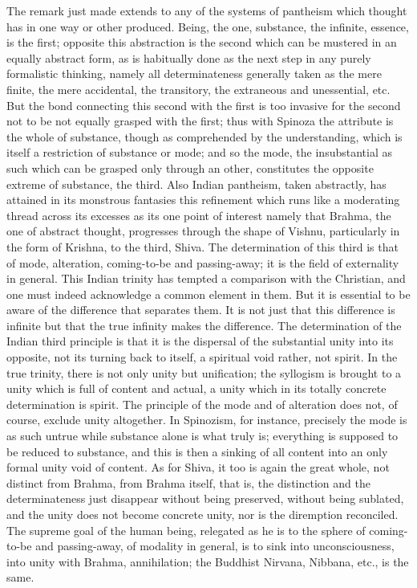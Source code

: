 The remark just made extends to any of the systems of pantheism
which thought has in one way or other produced.
Being, the one, substance, the infinite, essence, is the first;
opposite this abstraction is the second which
can be mustered in an equally abstract form,
as is habitually done as the next step in any purely formalistic thinking,
namely all determinateness generally taken as the mere finite,
the mere accidental, the transitory, the extraneous and unessential, etc.
But the bond connecting this second with the first is too invasive
for the second not to be not equally grasped with the first;
thus with Spinoza the attribute is the whole of substance,
though as comprehended by the understanding,
which is itself a restriction of substance or mode;
and so the mode, the insubstantial as such which can
be grasped only through an other,
constitutes the opposite extreme of substance, the third.
Also Indian pantheism, taken abstractly, has attained
in its monstrous fantasies this refinement
which runs like a moderating thread across its excesses
as its one point of interest namely
that Brahma, the one of abstract thought,
progresses through the shape of Vishnu,
particularly in the form of Krishna, to the third, Shiva.
The determination of this third is that of mode, alteration,
coming-to-be and passing-away;
it is the field of externality in general.
This Indian trinity has tempted a comparison with the Christian,
and one must indeed acknowledge a common element in them.
But it is essential to be aware of the difference that separates them.
It is not just that this difference is infinite
but that the true infinity makes the difference.
The determination of the Indian third principle is that
it is the dispersal of the substantial unity into its opposite,
not its turning back to itself,
a spiritual void rather, not spirit.
In the true trinity, there is not only unity but unification;
the syllogism is brought to a unity which is full of content and actual,
a unity which in its totally concrete determination is spirit.
The principle of the mode and of alteration
does not, of course, exclude unity altogether.
In Spinozism, for instance, precisely the mode is as such untrue
while substance alone is what truly is;
everything is supposed to be reduced to substance,
and this is then a sinking of all content into
an only formal unity void of content.
As for Shiva, it too is again the great whole,
not distinct from Brahma, from Brahma itself, that is,
the distinction and the determinateness just disappear
without being preserved, without being sublated,
and the unity does not become concrete unity,
nor is the diremption reconciled.
The supreme goal of the human being,
relegated as he is to the sphere
of coming-to-be and passing-away,
of modality in general,
is to sink into unconsciousness,
into unity with Brahma, annihilation;
the Buddhist Nirvana, Nibbana, etc., is the same.

